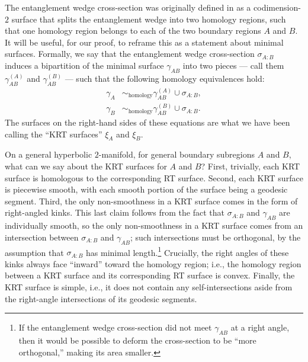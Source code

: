 \documentclass[a4paper,11pt]{article}
\begin{document}
The entanglement wedge cross-section was originally defined in \cite{EOP1,EOP2} as a codimension-$2$ surface that splits the entanglement wedge into two homology regions, such that one homology region belongs to each of the two boundary regions $A$ and $B$. It will be useful, for our proof, to reframe this as a statement about minimal surfaces. Formally, we say that the entanglement wedge cross-section $\sigma_{A:B}$ induces a bipartition of the minimal surface $\gamma_{AB}$ into two pieces --- call them $\gamma_{AB}^{(A)}$ and $\gamma_{AB}^{(B)}$ --- such that the following homology equivalences hold:
\begin{align}
    \gamma_A & \sim_{\text{homology}} \gamma_{AB}^{(A)} \cup \sigma_{A:B}, \\
    \gamma_B & \sim_{\text{homology}} \gamma_{AB}^{(B)} \cup \sigma_{A:B}.
\end{align}
The surfaces on the right-hand sides of these equations are what we have been calling the ``KRT surfaces'' $\xi_A$ and $\xi_B$.

On a general hyperbolic $2$-manifold, for general boundary subregions $A$ and $B$, what can we say about the KRT surfaces for $A$ and $B$? First, trivially, each KRT surface is homologous to the corresponding RT surface. Second, each KRT surface is piecewise smooth, with each smooth portion of the surface being a geodesic segment. Third, the only non-smoothness in a KRT surface comes in the form of right-angled kinks. This last claim follows from the fact that $\sigma_{A:B}$ and $\gamma_{AB}$ are individually smooth, so the only non-smoothness in a KRT surface comes from an intersection between $\sigma_{A:B}$ and $\gamma_{AB}$; such intersections must be orthogonal, by the assumption that $\sigma_{A:B}$ has minimal length.\footnote{If the entanglement wedge cross-section did not meet $\gamma_{AB}$ at a right angle, then it would be possible to deform the cross-section to be ``more orthogonal,'' making its area smaller.} Crucially, the right angles of these kinks always face ``inward'' toward the homology region; i.e., the homology region between a KRT surface and its corresponding RT surface is convex. Finally, the KRT surface is simple, i.e., it does not contain any self-intersections aside from the right-angle intersections of its geodesic segments.
\end{document}
